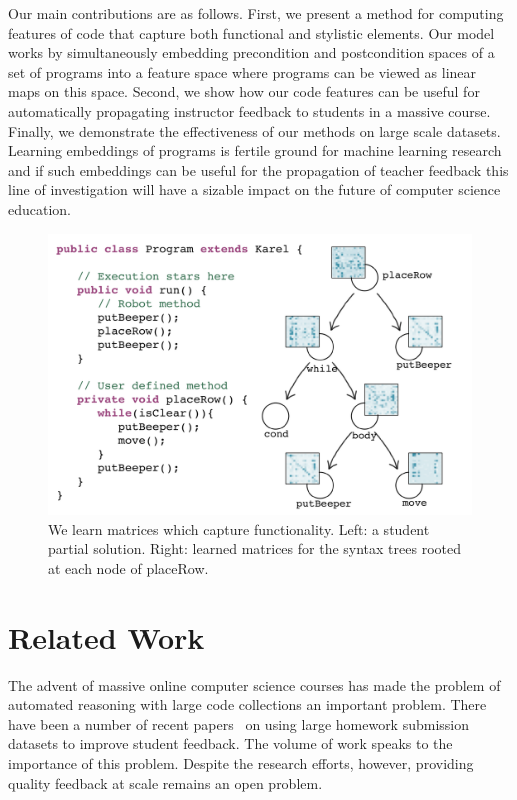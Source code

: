 Our main contributions are as follows. First, we present a 
method for computing features of code that capture both functional
and stylistic elements.  Our model works by simultaneously embedding precondition and postcondition spaces of 
a set of programs into a feature space where programs can be viewed as linear maps on this space.
Second, we show how our code features can be useful for automatically
propagating instructor feedback to students in a massive course.
Finally, we demonstrate the effectiveness of our methods
on large scale datasets.
Learning embeddings of programs is fertile ground for machine learning research and if such embeddings can be useful for the propagation of teacher feedback this line of investigation will have a sizable impact on the future of computer science education.

\begin{figure}[t]
\centering
\includegraphics[width=.65\columnwidth]{img/splash2_noborder}
\caption[Schematic of program embedding hierarchy]{We learn matrices which capture functionality. Left: a student partial solution. Right: learned matrices for the syntax trees rooted at each node of placeRow.}
\label{fig:splash}
\end{figure}

\section{Related Work}\label{sec:related}
The advent of massive online computer science courses 
has made the problem of automated reasoning with large code
collections an important problem.
There have been a number of recent papers~\cite{huangetal13,basu2013powergrading,nguyen14,brooks2014divide,lan2015mathematical, piech2015} on using large
homework submission datasets to improve student feedback. The volume of work speaks to the importance of this problem. Despite the research efforts, however, providing quality feedback at scale remains an open problem. 

